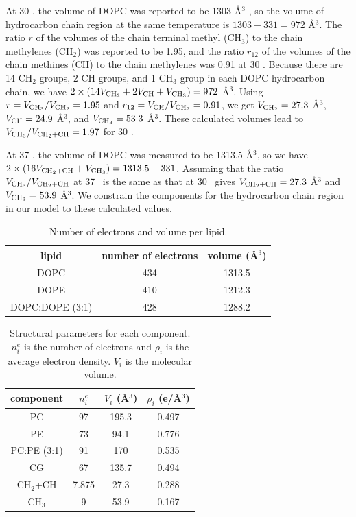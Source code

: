 At 30 \textcelsius, the volume of DOPC was reported to be 1303 \AA$^3$ \cite{Kucerka08}, 
so the volume of hydrocarbon chain region at the same temperature is 
$1303 - 331 = 972$ \AA$^3$. The ratio $r$ of the volumes
of the chain terminal methyl (CH$_3$) to the chain methylenes (CH$_2$) was 
reported to be 1.95, and the ratio $r_{12}$ of the volumes of the chain
methines (CH) to the chain methylenes was 0.91 at 30 \textcelsius. 
Because there are 14 CH$_2$ groups,
2 CH groups, and 1 CH$_3$ group in each DOPC hydrocarbon chain, we have
$2\times(14V_{\textrm{CH}_2}+2V_\textrm{CH}+V_{\textrm{CH}_3})=972$ \AA$^3$. 
Using $r=V_{\textrm{CH}_3}/V_{\textrm{CH}_2}=1.95$ 
and $r_{12}=V_\textrm{CH}/V_{\textrm{CH}_2}=0.91$, we get $V_{\textrm{CH}_2}=27.3$ \AA$^3$, 
$V_\textrm{CH}=24.9$ \AA$^3$, and $V_{\textrm{CH}_3}=53.3$ \AA$^3$. 
These calculated volumes lead to $V_{\textrm{CH}_3}/V_{\textrm{CH}_2+\textrm{CH}}=1.97$  for 30 \textcelsius. 

At 37 \textcelsius, the volume of DOPC was measured to be 1313.5 \AA$^3$, so
we have $2\times(16V_{\textrm{CH}_2+\textrm{CH}}+V_{\textrm{CH}_3})=1313.5-331$. Assuming that the ratio 
$V_{\textrm{CH}_3}/V_{\textrm{CH}_2+\textrm{CH}}$ at 37 \textcelsius\ is the same as that at 30 \textcelsius\ 
gives $V_{\textrm{CH}_2+\textrm{CH}}=27.3$ \AA$^3$ and $V_{\textrm{CH}_3}=53.9$ \AA$^3$. We constrain
the components for the hydrocarbon chain region in our model 
to these calculated values.

\begin{table}[htbp]
  \centering
  \begin{tabular}{ccc}
    \hline
    lipid & number of electrons & volume (\AA$^3$) \\
    \hline
    DOPC & 434 & 1313.5 \\
    DOPE & 410 & 1212.3 \\
    DOPC:DOPE (3:1) & 428 & 1288.2 \\
    \hline
  \end{tabular}
  \caption{Number of electrons and volume per lipid.}
  \label{tab:electron_volume}
\end{table}

\begin{table}[htbp]
  \centering
  \begin{tabular}{cccc}
    \hline
    component & $n^e_i$ & $V_i$ (\AA$^3$) & $\rho_i$ (e/\AA$^3$) \\
    \hline 
    PC & 97 & 195.3 & 0.497 \\  
    PE & 73 & 94.1  & 0.776 \\
    PC:PE (3:1) & 91 & 170 & 0.535 \\
    CG & 67 & 135.7 & 0.494 \\  
    CH$_2$+CH & 7.875 & 27.3 & 0.288 \\
    CH$_3$ & 9 & 53.9 & 0.167 \\
    \hline
  \end{tabular}
  \caption{Structural parameters for each component. 
  $n^e_i$ is the number of electrons and
  $\rho_i$ is the average electron density.
  $V_i$ is the molecular volume.
  }
  \label{tab:component}
\end{table}

